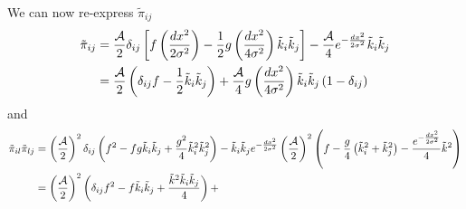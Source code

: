 \documentclass{revtex4}
\begin{document}
We can now re-express $\tilde{\pi}_{ij}$
\begin{align}
  \tilde{\pi}_{ij} &= \frac{\mathcal{A}}{2}\delta_{ij}\left[f\left(\frac{dx^2}{2\sigma^2}\right) - \frac{1}{2}g\left(\frac{dx^2}{4\sigma^2}\right)\tilde{k}_i\tilde{k}_j\right] - \frac{\mathcal{A}}{4}e^{-\frac{dx^2}{2\sigma^2}}\tilde{k}_i\tilde{k}_j \\
  &= \frac{\mathcal{A}}{2}\left(\delta_{ij}f - \frac{1}{2}\tilde{k}_i\tilde{k}_j\right) + \frac{\mathcal{A}}{4}g\left(\frac{dx^2}{4\sigma^2}\right)\tilde{k}_i\tilde{k}_j\left(1-\delta_{ij}\right)
\end{align}
and
\begin{align}
  \tilde{\pi}_{il}\tilde{\pi}_{lj} &= \left(\frac{\mathcal{A}}{2}\right)^2\delta_{ij}\left(f^2 - fg\tilde{k}_i\tilde{k}_j + \frac{g^2}{4}\tilde{k}_i^2\tilde{k}_j^2\right) - \tilde{k}_i\tilde{k}_je^{-\frac{dx^2}{2\sigma^2}}\left(\frac{\mathcal{A}}{2}\right)^2\left( f- \frac{g}{4}\left(\tilde{k}_i^2+\tilde{k}_j^2\right) - \frac{e^{-\frac{dx^2}{2\sigma^2}}}{4}\tilde{k}^2\right) \\
  &= \left(\frac{\mathcal{A}}{2}\right)^2\left(\delta_{ij}f^2 - f\tilde{k}_i\tilde{k}_j+\frac{\tilde{k}^2\tilde{k}_i\tilde{k}_j}{4}\right) + 
\end{align}
\end{document}
